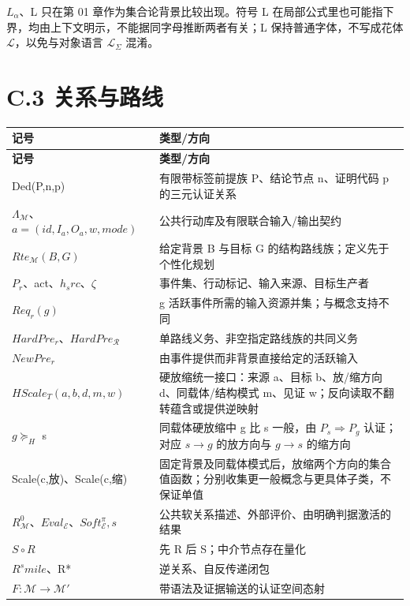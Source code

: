 \documentclass[UTF8,a4paper,zihao=-4,fontset=windows,openany]{ctexbook}
\def\mathrm#1{#1}%
\begin{document}
\(L_\alpha\)、L 只在第 01 章作为集合论背景比较出现。符号 L 在局部公式里也可能指下界，均由上下文明示，不能据同字母推断两者有关；L 保持普通字体，不写成花体 \(\mathcal{L}\)，以免与对象语言 \(\mathcal{L}_\Sigma\) 混淆。

\section{C.3 关系与路线}
\begingroup\small\setlength{\tabcolsep}{4pt}
\begin{longtable}{>{\raggedright\arraybackslash}p{}>{\raggedright\arraybackslash}p{}}
\toprule
\textbf{记号} & \textbf{类型/方向} \\
\midrule
\endfirsthead
\toprule
\textbf{记号} & \textbf{类型/方向} \\
\midrule
\endhead
\bottomrule
\endfoot
\bottomrule
\endlastfoot
Ded(P,n,p) & 有限带标签前提族 P、结论节点 n、证明代码 p 的三元认证关系 \\
\(\Lambda_\mathcal{M}\)、\(a=(\mathrm{id},I_a,O_a,w,\mathrm{mode})\) & 公共行动库及有限联合输入/输出契约 \\
\(\mathrm{Rte}_\mathcal{M}(B,G)\) & 给定背景 B 与目标 G 的结构路线族；定义先于个性化规划 \\
\(P_r\)、act、\(h_\mathrm{src}\)、\(\zeta\) & 事件集、行动标记、输入来源、目标生产者 \\
\(\mathrm{Req}_r(g)\) & g 活跃事件所需的输入资源并集；与概念支持不同 \\
\(\mathrm{HardPre}_r\)、\(\mathrm{HardPre}_\mathcal{R}\) & 单路线义务、非空指定路线族的共同义务 \\
\(\mathrm{NewPre}_r\) & 由事件提供而非背景直接给定的活跃输入 \\
\(\mathrm{HScale}_T(a,b,d,m,w)\) & 硬放缩统一接口：来源 a、目标 b、放/缩方向 d、同载体/结构模式 m、见证 w；反向读取不翻转蕴含或提供逆映射 \\
\(g\succeq_H\) s & 同载体硬放缩中 g 比 s 一般，由 \(P_s\Rightarrow P_g\) 认证；对应 \(s\to g\) 的放方向与 \(g\to s\) 的缩方向 \\
Scale(c,放)、Scale(c,缩) & 固定背景及同载体模式后，放缩两个方向的集合值函数；分别收集更一般概念与更具体子类，不保证单值 \\
\(R^{0}_\mathcal{M}\)、\(\mathrm{Eval}_\mathcal{E}\)、\(\mathrm{Soft}^\pi_\mathcal{E},s\) & 公共软关系描述、外部评价、由明确判据激活的结果 \\
\(S\circ R\) & 先 R 后 S；中介节点存在量化 \\
\(R^\mathrm{smile}\)、R* & 逆关系、自反传递闭包 \\
\(F:\mathcal{M}\to\mathcal{M}'\) & 带语法及证据输送的认证空间态射 \\
\end{longtable}
\endgroup
\end{document}
